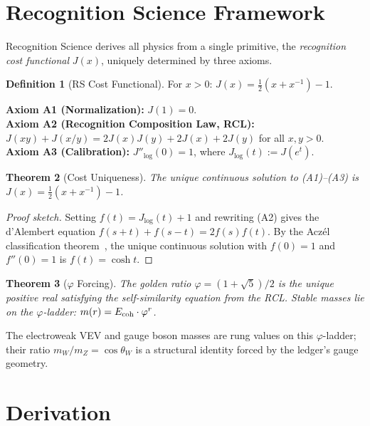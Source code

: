 \documentclass[12pt,a4paper]{article}
\newtheorem{theorem}{Theorem}[section]
\theoremstyle{definition}
\newtheorem{definition}[theorem]{Definition}
\theoremstyle{remark}
\begin{document}
\section{Recognition Science Framework}
\label{sec:framework}

Recognition Science derives all physics from a single primitive,
the \emph{recognition cost functional} $J(x)$, uniquely determined
by three axioms.

\begin{definition}[RS Cost Functional]
For $x > 0$: $J(x) = \tfrac{1}{2}(x + x^{-1}) - 1$.
\end{definition}

\noindent\textbf{Axiom A1 (Normalization):} $J(1) = 0$.\\
\textbf{Axiom A2 (Recognition Composition Law, RCL):}
$J(xy) + J(x/y) = 2J(x)J(y) + 2J(x) + 2J(y)$ for all $x, y > 0$.\\
\textbf{Axiom A3 (Calibration):} $J''_{\log}(0) = 1$, where
$J_{\log}(t) := J(e^t)$.

\begin{theorem}[Cost Uniqueness]
\label{thm:unique}
The unique continuous solution to \textup{(A1)--(A3)} is
$J(x) = \tfrac{1}{2}(x + x^{-1}) - 1$.
\end{theorem}

\begin{proof}[Proof sketch]
Setting $f(t) = J_{\log}(t) + 1$ and rewriting \textup{(A2)} gives the
d'Alembert equation $f(s+t) + f(s-t) = 2f(s)f(t)$.  By the Acz\'el
classification theorem~\cite{Aczel1966}, the unique continuous solution
with $f(0) = 1$ and $f''(0) = 1$ is $f(t) = \cosh t$.
\end{proof}

\begin{theorem}[$\varphi$ Forcing]
\label{thm:phi}
The golden ratio $\varphi = (1+\sqrt{5})/2$ is the unique positive real
satisfying the self-similarity equation from the RCL\@.  Stable masses lie
on the $\varphi$-ladder: $m(r) = E_{\rm coh}\cdot\varphi^r$.
\end{theorem}

\noindent The electroweak VEV and gauge boson masses are rung values on this
$\varphi$-ladder; their ratio $m_W/m_Z = \cos\theta_W$ is a structural
identity forced by the ledger's gauge geometry.

\section{Derivation}
\label{sec:derive}
\end{document}
